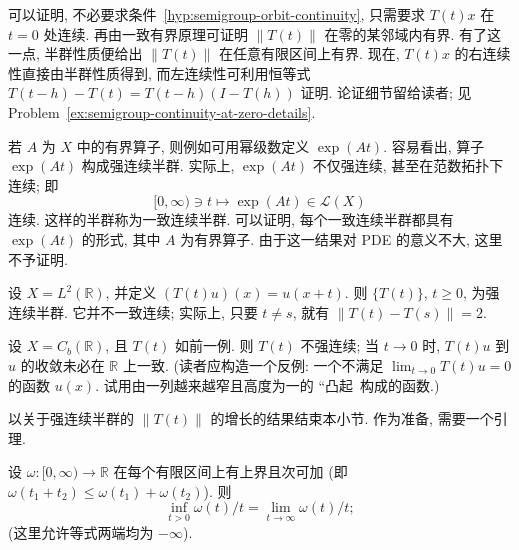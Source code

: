 \begin{Remark}
\label{rem:semigroup-continuity-at-zero}
可以证明, 不必要求条件~\ref{hyp:semigroup-orbit-continuity}, 只需要求 $T(t)x$ 在 $t=0$ 处连续. 再由一致有界原理可证明 $\|T(t)\|$ 在零的某邻域内有界. 有了这一点, 半群性质便给出 $\|T(t)\|$ 在任意有限区间上有界. 现在, $T(t)x$ 的右连续性直接由半群性质得到, 而左连续性可利用恒等式 $T(t-h)-T(t)=T(t-h)(I-T(h))$ 证明. 论证细节留给读者; 见 Problem~\ref{ex:semigroup-continuity-at-zero-details}.
\end{Remark}

\begin{Example}
\label{ex:bounded-generator-uniformly-continuous-semigroup}
若 $A$ 为 $X$ 中的有界算子, 则例如可用幂级数定义 $\exp(At)$. 容易看出, 算子 $\exp(At)$ 构成强连续半群. 实际上, $\exp(At)$ 不仅强连续, 甚至在范数拓扑下连续; 即\[[0,\infty)\ni t\mapsto\exp(At)\in\mathcal{L}(X)\]连续. 这样的半群称为一致连续半群. 可以证明, 每个一致连续半群都具有 $\exp(At)$ 的形式, 其中 $A$ 为有界算子. 由于这一结果对 PDE 的意义不大, 这里不予证明.
\end{Example}

\begin{Example}
\label{ex:ltwo-translation-semigroup}
设 $X=L^2(\mathbb{R})$, 并定义 $(T(t)u)(x)=u(x+t)$. 则 $\{T(t)\}$, $t\geq0$, 为强连续半群. 它并不一致连续; 实际上, 只要 $t\neq s$, 就有 $\|T(t)-T(s)\|=2$.
\end{Example}

\begin{Example}
\label{ex:bounded-continuous-translation-not-strongly-continuous}
设 $X=C_b(\mathbb{R})$, 且 $T(t)$ 如前一例. 则 $T(t)$ 不强连续; 当 $t\to0$ 时, $T(t)u$ 到 $u$ 的收敛未必在 $\mathbb{R}$ 上一致. (读者应构造一个反例: 一个不满足 $\lim_{t\to0}T(t)u=0$ 的函数 $u(x)$. 试用由一列越来越窄且高度为一的 ``凸起\textquotesingle\textquotesingle\ 构成的函数.)
\end{Example}

以关于强连续半群的 $\|T(t)\|$ 的增长的结果结束本小节. 作为准备, 需要一个引理.

\begin{Lemma}
\label{lem:subadditive-growth-limit}
设 $\omega:[0,\infty)\to\mathbb{R}$ 在每个有限区间上有上界且次可加 (即 $\omega(t_1+t_2)\leq\omega(t_1)+\omega(t_2)$). 则\[\inf_{t>0}\omega(t)/t=\lim_{t\to\infty}\omega(t)/t;\](这里允许等式两端均为 $-\infty$).
\end{Lemma}

